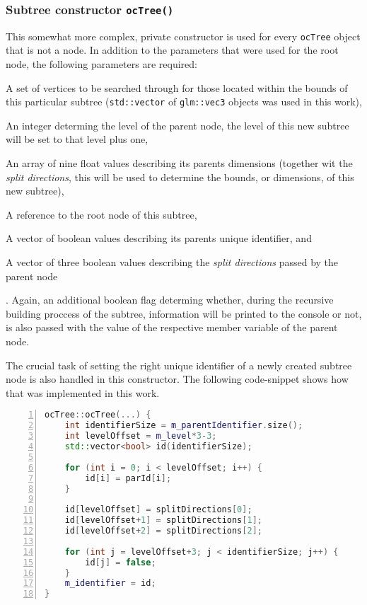 \subsubsection{Subtree constructor \texttt{ocTree()}}
	This somewhat more complex, private constructor is used for every \texttt{ocTree} object that is not a node. In addition to the parameters that were used for the root node, the following parameters are required:
	\begin{enumerate*}
		\item A set of vertices to be searched through for those located within the bounds of this particular subtree (\texttt{std::vector} of \texttt{glm::vec3} objects was used in this work), 
		\item An integer determing the level of the parent node, the level of this new subtree will be set to that level plus one,
		\item An array of nine float values describing its parents dimensions (together wit the \textit{split directions}, this will be used to determine the bounds, or dimensions, of this new subtree),
		\item A reference to the root node of this subtree,
		\item A vector of boolean values describing its parents unique identifier, and
		\item A vector of three boolean values describing the \textit{split directions} passed by the parent node
	\end{enumerate*}.
	Again, an additional boolean flag determing whether, during the recursive building proccess of the subtree, information will be printed to the console or not, is also passed with the value of the respective member variable of the parent node.

The crucial task of setting the right unique identifier of a newly created subtree node is also handled in this constructor. The following code-snippet shows how that was implemented in this work.

\begin{minipage}{\linewidth}
\begin{lstlisting}[language=C++,numberstyle=\zebra{black!5}{white}{},numbers=left,xleftmargin=2em,tabsize=3]
ocTree::ocTree(...) {
	int identifierSize = m_parentIdentifier.size();
	int levelOffset = m_level*3-3;
	std::vector<bool> id(identifierSize);

	for (int i = 0; i < levelOffset; i++) {
		id[i] = parId[i];
	}

	id[levelOffset] = splitDirections[0];
	id[levelOffset+1] = splitDirections[1];
	id[levelOffset+2] = splitDirections[2];

	for (int j = levelOffset+3; j < identifierSize; j++) {
		id[j] = false;
	}
	m_identifier = id;
}
\end{lstlisting}
\end{minipage}

